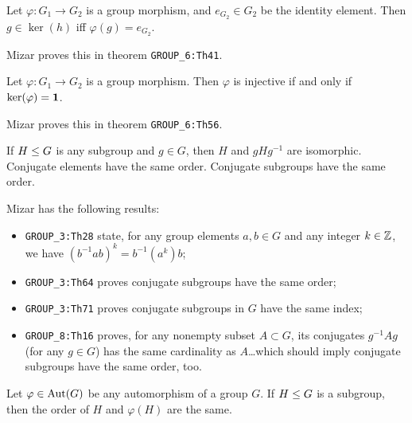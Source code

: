 \begin{theorem}
  Let $\varphi\colon G_{1}\to G_{2}$ is a group morphism, and
  $e_{G_{2}}\in G_{2}$ be the identity element.
  Then $g\in\ker(h)$ iff $\varphi(g)=e_{G_{2}}$.
\end{theorem}

\begin{remark}
Mizar proves this in theorem \verb#GROUP_6:Th41#.
\end{remark}

\begin{theorem}
  Let $\varphi\colon G_{1}\to G_{2}$ is a group morphism.
  Then $\varphi$ is injective if and only if $\ker(\varphi)=\mathbf{1}$.
\end{theorem}

\begin{remark}
Mizar proves this in theorem \verb#GROUP_6:Th56#.
\end{remark}

\begin{theorem}
  If $H\leq G$ is any subgroup and $g\in G$, then
  $H$ and $gHg^{-1}$ are isomorphic. Conjugate elements have the same
  order. Conjugate subgroups have the same order.
\end{theorem}

\begin{remark}
Mizar has the following results:
\begin{itemize}
\item \verb#GROUP_3:Th28# state, for any group elements $a,b\in G$ and
  any integer $k\in\mathbb{Z}$, we have $(b^{-1}ab)^{k} = b^{-1}(a^{k})b$;
\item \verb#GROUP_3:Th64# proves conjugate subgroups have the same order;
\item \verb#GROUP_3:Th71# proves conjugate subgroups in $G$ have the
  same index;
\item \verb#GROUP_8:Th16# proves, for any nonempty subset $A\subset G$,
  its conjugates $g^{-1}Ag$ (for any $g\in G$) has the same cardinality
  as $A$\dots which should imply conjugate subgroups have the same
  order, too.
\end{itemize}
\end{remark}

\begin{theorem}\label{thm:pure-math:iso-subgroups-have-same-order}
  Let $\varphi\in\operatorname{Aut}(G)$ be any automorphism of a group $G$.
  If $H\leq G$ is a subgroup, then the order of $H$ and
  $\varphi(H)$ are the same.
\end{theorem}

